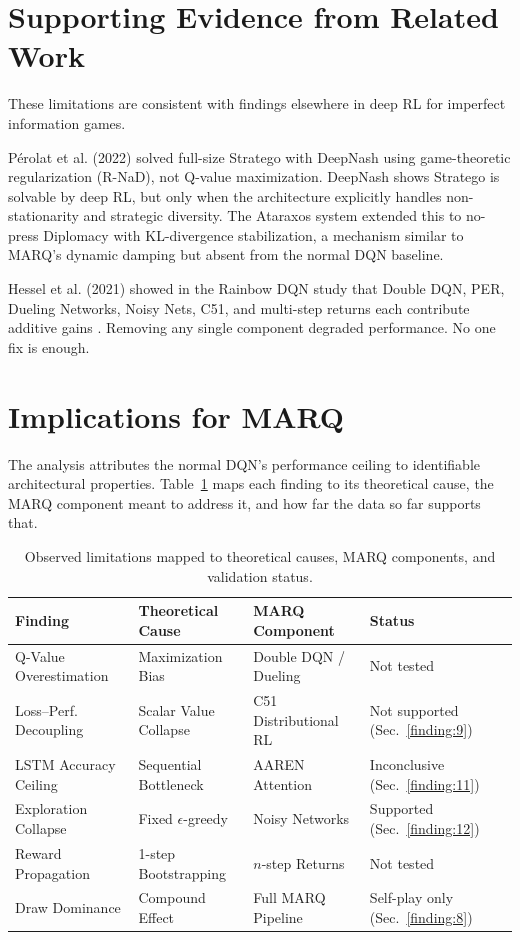 \section{Supporting Evidence from Related Work}

These limitations are consistent with findings elsewhere in deep RL for imperfect information games.

P\'{e}rolat et al. (2022) solved full-size Stratego with DeepNash \cite{perolat2022stratego} using game-theoretic regularization (R-NaD), not Q-value maximization. DeepNash shows Stratego is solvable by deep RL, but only when the architecture explicitly handles non-stationarity and strategic diversity. The Ataraxos system \cite{Ataraxos2025} extended this to no-press Diplomacy with KL-divergence stabilization, a mechanism similar to MARQ's dynamic damping but absent from the normal DQN baseline.

Hessel et al. (2021) showed in the Rainbow DQN study that Double DQN, PER, Dueling Networks, Noisy Nets, C51, and multi-step returns each contribute additive gains \cite{RainbowJMLR2021}. Removing any single component degraded performance. No one fix is enough.


\section{Implications for MARQ}

The analysis attributes the normal DQN's performance ceiling to identifiable architectural properties. Table~\ref{tab:limitation_mapping} maps each finding to its theoretical cause, the MARQ component meant to address it, and how far the data so far supports that.

\begin{table}[htbp]
    \centering
    \caption{Observed limitations mapped to theoretical causes, MARQ components, and validation status.}
    \label{tab:limitation_mapping}
    \begin{tabular}{|p{3cm}|p{3.5cm}|p{3.5cm}|p{2.5cm}|}
        \hline
        \textbf{Finding} & \textbf{Theoretical Cause} & \textbf{MARQ Component} & \textbf{Status} \\
        \hline
        Q-Value Overestimation & Maximization Bias & Double DQN / Dueling & Not tested \\
        \hline
        Loss--Perf. Decoupling & Scalar Value Collapse & C51 Distributional RL & Not supported (Sec.~\ref{finding:9}) \\
        \hline
        LSTM Accuracy Ceiling & Sequential Bottleneck & AAREN Attention & Inconclusive (Sec.~\ref{finding:11}) \\
        \hline
        Exploration Collapse & Fixed $\epsilon$-greedy & Noisy Networks & Supported (Sec.~\ref{finding:12}) \\
        \hline
        Reward Propagation & 1-step Bootstrapping & $n$-step Returns & Not tested \\
        \hline
        Draw Dominance & Compound Effect & Full MARQ Pipeline & Self-play only (Sec.~\ref{finding:8}) \\
        \hline
    \end{tabular}
\end{table}

